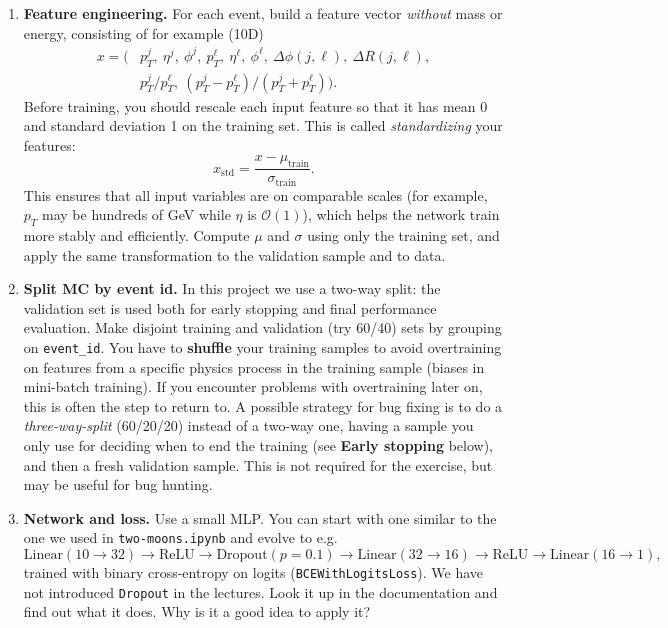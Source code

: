 \documentclass[11pt]{article}
\begin{document}
\begin{enumerate}[label=\textbf{B\arabic*.}]
  \item \textbf{Feature engineering.} For each event, build a feature vector \emph{without} mass or energy, consisting of for example (10D)
  \begin{align*}
  x = (&p_T^j,\ \eta^j,\ \phi^j,\ p_T^\ell,\ \eta^\ell,\ \phi^\ell,\ \Delta\phi(j,\ell),\ \Delta R(j,\ell),\\
      &p_T^j/p_T^\ell,\ (p_T^j-p_T^\ell)/(p_T^j{+}p_T^\ell)).
  \end{align*}
  Before training, you should rescale each input feature so that it has mean 0 and standard deviation 1 on the training set. This is called \emph{standardizing} your features:
  \[
    x_\text{std} = \frac{x - \mu_\text{train}}{\sigma_\text{train}}.
  \]
  This ensures that all input variables are on comparable scales (for example, $p_T$ may be hundreds of GeV while $\eta$ is $\mathcal{O}(1)$), which helps the network train more stably and efficiently. Compute $\mu$ and $\sigma$ using only the training set, and apply the same transformation to the validation sample and to data.
  \item \textbf{Split MC by event id.} In this project we use a two-way split: the validation set is used both for early stopping and final performance evaluation. Make disjoint training and validation (try 60/40) sets by grouping on \texttt{event\_id}. You have to \textbf{shuffle} your training samples to avoid overtraining on features from a specific physics process in the training sample (biases in mini-batch training). If you encounter problems with overtraining later on, this is often the step to return to. A possible strategy for bug fixing is to do a \textit{three-way-split} (60/20/20) instead of a two-way one, having a sample you only use for deciding when to end the training (see \textbf{Early stopping} below), and then a fresh validation sample. This is not required for the exercise, but may be useful for bug hunting.
  \item \textbf{Network and loss.} Use a small MLP. You can start with one similar to the one we used in \texttt{two-moons.ipynb} and evolve to e.g.
  \[
    \text{Linear}(10\!\to\!32)\to\text{ReLU}\to\text{Dropout}(p=0.1)\to
    \text{Linear}(32\!\to\!16)\to\text{ReLU}\to
    \text{Linear}(16\!\to\!1),
  \]
  trained with binary cross-entropy on logits (\texttt{BCEWithLogitsLoss}). We have not introduced \texttt{Dropout} in the lectures. Look it up in the documentation and find out what it does. Why is it a good idea to apply it?

\end{enumerate}
\end{document}
